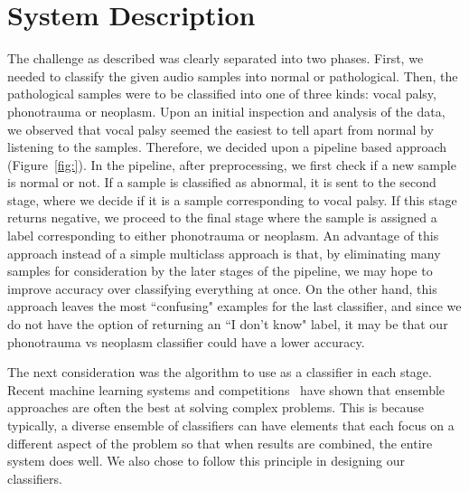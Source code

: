 \section{System Description}
\def\hyp{\mathbf{w}}
\def\boldxi{\mbox{\boldmath$\xi$}}
\def\smallboldxi{\mbox{\boldmath\scriptsize{$\xi$}}}

The challenge as described was clearly separated into two phases. First, we needed to classify the given audio samples into normal or pathological. Then, the pathological samples were to be classified into one of three kinds: vocal palsy, phonotrauma or neoplasm. Upon an initial inspection and analysis of the data, we observed that vocal palsy seemed the easiest to tell apart from normal by listening to the samples. Therefore, we decided upon a pipeline based approach (Figure~\ref{fig:}). In the pipeline, after preprocessing, we first check if a new sample is normal or not. If a sample is classified as abnormal, it is sent to the second stage, where we decide if it is a sample corresponding to vocal palsy. If this stage returns negative, we proceed to the final stage where the sample is assigned a label corresponding to either phonotrauma or neoplasm. An advantage of this approach instead of a simple multiclass approach is that, by eliminating many samples for consideration by the later stages of the pipeline, we may hope to improve accuracy over classifying everything at once. On the other hand, this approach leaves the most ``confusing" examples for the last classifier, and since we do not have the option of returning an ``I don't know" label, it may be that our phonotrauma vs neoplasm classifier could have a lower accuracy.

The next consideration was the algorithm to use as a classifier in each stage. Recent machine learning systems and competitions~\cite{} have shown that ensemble approaches are often the best at solving complex problems. This is because typically, a diverse ensemble of classifiers can have elements that each focus on a different aspect of the problem so that when results are combined, the entire system does well. We also chose to follow this principle in designing our classifiers. 

